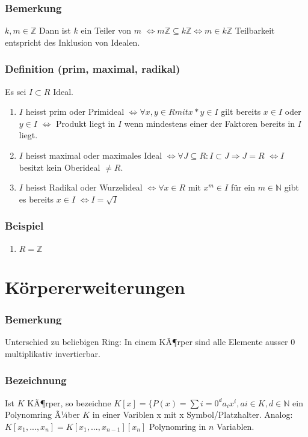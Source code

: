 \documentclass[12pt,a4paper,ngerman]{scrreprt}
\begin{document}
\subsection{Bemerkung}
$k,m \in \mathbb{Z}$ Dann ist $k$ ein Teiler von $m$ 
$\Leftrightarrow m\mathbb{Z} \subseteq k\mathbb{Z} \Leftrightarrow m \in k\mathbb{Z}$
Teilbarkeit entspricht des Inklusion von Idealen.

\subsection{Definition (prim, maximal, radikal)}
Es sei $I \subset R$ Ideal.
\begin{enumerate}[]
\item  $I$ heisst prim oder Primideal $\Leftrightarrow \forall x,y \in R mit x*y \in I$ gilt bereits $x \in I$ oder $y \in I$
$\Leftrightarrow$ Produkt liegt in $I$ wenn mindestens einer der Faktoren bereits in $I$ liegt.
\item $I$ heisst maximal oder maximales Ideal $\Leftrightarrow \forall J \subseteq R: I \subset J \Rightarrow J=R$
$\Leftrightarrow I$ besitzt kein Oberideal $\neq R$.
\item $I$ heisst Radikal oder Wurzelideal 
$\Leftrightarrow \forall x \in R$ mit $x^m \in I$ für ein 
$m \in \mathbb{N}$ gibt es bereits $x \in I$
$\Leftrightarrow I=\sqrt{I}$
\end{enumerate}

\subsection{Beispiel}
\begin{enumerate}[]
\item $R = \mathbb{Z}$
\end{enumerate}



\chapter{Körpererweiterungen}
\subsection{Bemerkung}

Unterschied zu beliebigen Ring: In einem KÃ¶rper sind alle Elemente ausser 0 multiplikativ invertierbar.

\subsection{Bezeichnung}
Ist $K$ KÃ¶rper, so bezeichne $K[x] = \{ P(x) = \sum{i=0}^d a_i x^i , ai \in K, d\in \mathbb{N}$
ein Polynomring Ã¼ber $K$ in einer Variblen x mit x Symbol/Platzhalter.
Analog: $K[x_1, ..., x_n] = K[x_1, ... , x_{n-1}][x_n]$ Polynomring in $n$ Variablen.
\end{document}
